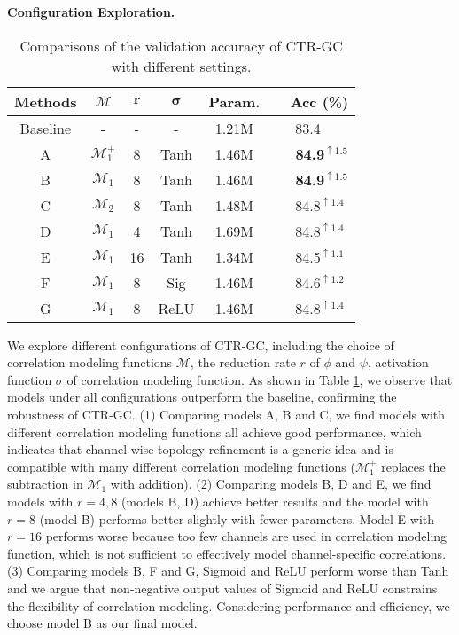 \documentclass[10pt,twocolumn,letterpaper]{article}
\begin{document}
\noindent \textbf{Configuration Exploration.}
\begin{table}
	\begin{center}
		\begin{tabular}{c c c c c l}
			\hline
			\textbf{Methods} & $\boldsymbol{\mathcal{M}}$ & $\boldsymbol{r}$ & $\boldsymbol{\sigma}$ & \textbf{Param.} & \ \ \textbf{Acc (\%)}\\
			\hline\hline
			Baseline & - & - & -  & 1.21M & \ \ \ 83.4 \\
			\hline
			A & $\mathcal{M}_1^+$ & 8 & Tanh &  1.46M & \ \ \ \textbf{84.9}$^{\uparrow \mathbf{1.5}}$\\
			B & $\mathcal{M}_1$ & 8 & Tanh &  1.46M & \ \ \ \textbf{84.9}$^{\uparrow \mathbf{1.5}}$\\
			C & $\mathcal{M}_2$ & 8 & Tanh & 1.48M & \ \ \ 84.8$^{\uparrow 1.4}$\\
			\hline
			D & $\mathcal{M}_1$ &4 & Tanh &  1.69M & \ \ \ 84.8$^{\uparrow 1.4}$\\
			E & $\mathcal{M}_1$ &16 & Tanh & 1.34M & \ \ \ 84.5$^{\uparrow 1.1}$\\
			\hline
			F & $\mathcal{M}_1$ &8 & Sig & 1.46M & \ \ \ 84.6$^{\uparrow 1.2}$\\
			G & $\mathcal{M}_1$ &8 & ReLU & 1.46M & \ \ \ 84.8$^{\uparrow 1.4}$\\
			\hline
		\end{tabular}
	\end{center}
	\vspace{-0.2cm}
	\caption{Comparisons of the validation accuracy of CTR-GC with different settings.}
	\vspace{-0.5cm}
	\label{tab:config}
\end{table}
We explore different configurations of CTR-GC, including the choice of correlation modeling functions $\mathcal{M}$, the reduction rate $r$ of $\phi$ and $\psi$, activation function $\sigma$ of correlation modeling function. As shown in Table \ref{tab:config}, we observe that models under all configurations outperform the baseline, confirming the robustness of CTR-GC. (1) Comparing models A, B and C, we find models with different correlation modeling functions all achieve good performance, which indicates that channel-wise topology refinement is a generic idea and is compatible with many different correlation modeling functions ($\mathcal{M}_1^+$ replaces the subtraction in $\mathcal{M}_1$ with addition). (2) Comparing models B, D and E, we find models with $r=4,8$ (models B, D) achieve better results and the model with $r=8$ (model B) performs better slightly with fewer parameters. Model E with $r=16$ performs worse because too few channels are used in correlation modeling function, which is not sufficient to effectively model channel-specific correlations. (3) Comparing models B, F and G, Sigmoid and ReLU perform worse than Tanh and we argue that non-negative output values of Sigmoid and ReLU constrains the flexibility of correlation modeling. Considering performance and efficiency, we choose model B as our final model.
\end{document}
